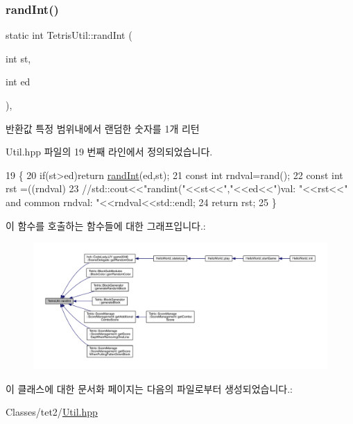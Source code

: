 \subsubsection{\texorpdfstring{rand\+Int()}{randInt()}}
{\footnotesize\ttfamily static int Tetris\+Util\+::rand\+Int (\begin{DoxyParamCaption}\item[{int}]{st,  }\item[{int}]{ed }\end{DoxyParamCaption})\hspace{0.3cm}{\ttfamily [inline]}, {\ttfamily [static]}}

\begin{DoxyReturn}{반환값}
특정 범위내에서 랜덤한 숫자를 1개 리턴 
\end{DoxyReturn}


Util.\+hpp 파일의 19 번째 라인에서 정의되었습니다.


\begin{DoxyCode}
19                                              \{
20             \textcolor{keywordflow}{if}(st>ed)\textcolor{keywordflow}{return} \hyperlink{class_tetris_util_a0a60e809425ddb416a500bcc03cf7061}{randInt}(ed,st);
21             \textcolor{keyword}{const} \textcolor{keywordtype}{int} rndval=rand();
22             \textcolor{keyword}{const} \textcolor{keywordtype}{int} rst =((rndval)%
23             \textcolor{comment}{//std::cout<<"randint("<<st<<","<<ed<<")val: "<<rst<<" and common rndval: "<<rndval<<std::endl;}
24             \textcolor{keywordflow}{return} rst;
25         \}
\end{DoxyCode}
이 함수를 호출하는 함수들에 대한 그래프입니다.\+:
\nopagebreak
\begin{figure}[H]
\begin{center}
\leavevmode
\includegraphics[width=350pt]{db/d37/class_tetris_util_a0a60e809425ddb416a500bcc03cf7061_icgraph}
\end{center}
\end{figure}


이 클래스에 대한 문서화 페이지는 다음의 파일로부터 생성되었습니다.\+:\begin{DoxyCompactItemize}
\item 
Classes/tet2/\hyperlink{_util_8hpp}{Util.\+hpp}\end{DoxyCompactItemize}
